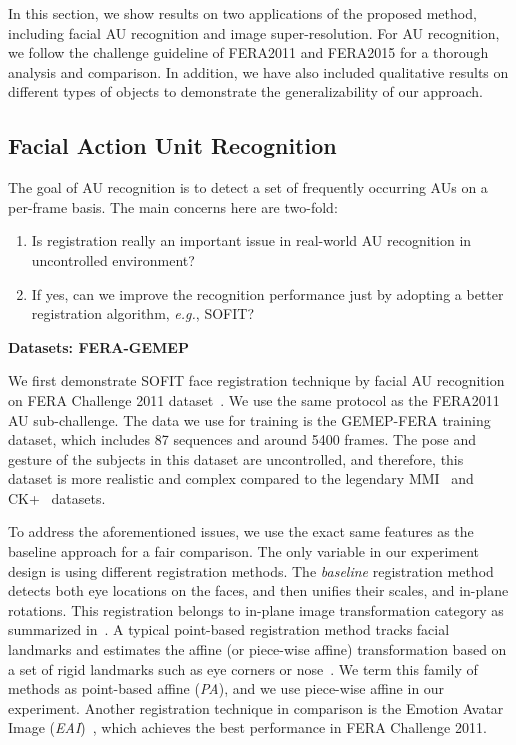 \documentclass[10pt,journal]{IEEEtran}
\begin{document}
In this section, we show results on two applications of the proposed method, including facial AU recognition and image super-resolution. For AU recognition, we follow the challenge guideline of FERA2011 and FERA2015 for a thorough analysis and comparison. In addition, we have also included qualitative results on different types of objects to demonstrate the generalizability of our approach.

\subsection{Facial Action Unit Recognition}

The goal of AU recognition is to detect a set of frequently occurring AUs on a per-frame basis. The main concerns here are two-fold:
\begin{enumerate}
\item Is registration really an important issue in real-world AU recognition in uncontrolled environment?
\item If yes, can we improve the recognition performance just by adopting a better registration algorithm, \textit{e.g.}, SOFIT?
\end{enumerate}

\noindent \textbf{Datasets: FERA-GEMEP}

We first demonstrate SOFIT face registration technique by facial AU recognition on FERA Challenge 2011 dataset~\cite{FERA11}. We use the same protocol as the FERA2011~\cite{Valstar_FERA11} AU sub-challenge. The data we use for training is the GEMEP-FERA training dataset, which includes 87 sequences and around 5400 frames. The pose and gesture of the subjects in this dataset are uncontrolled, and therefore, this dataset is more realistic and complex compared to the legendary MMI~\cite{Pantic_ICME05} and CK+~\cite{Kanade_FG00} datasets.

To address the aforementioned issues, we use the exact same features as the baseline approach for a fair comparison. The only variable in our experiment design is using different registration methods. The \textit{baseline} registration method detects both eye locations on the faces, and then unifies their scales, and in-plane rotations. This registration belongs to in-plane image transformation category as summarized in~\cite{Yang_SMCB12}. A typical point-based registration method tracks facial landmarks and estimates the affine (or piece-wise affine) transformation based on a set of rigid landmarks such as eye corners or nose~\cite{Littlewort_CERT_FG2011,Valstar_SMCB12,IntraFace,McDuff_TAC14,Tadas_ECCV14}. We term this family of methods as point-based affine (\textit{PA}), and we use piece-wise affine in our experiment. Another registration technique in comparison is the Emotion Avatar Image (\textit{EAI})~\cite{Yang_SMCB12}, which achieves the best performance in FERA Challenge 2011.
\end{document}

